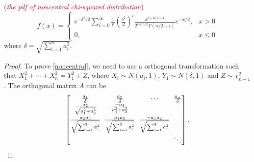 \documentclass{article}
\begin{document}
\begin{CJK}{UTF8}{gbsn}
    \begin{Inference}
        (\textcolor{red}{\textit{the pdf of noncentral chi-squared distribution}})
        \begin{equation}
            f(x) =
            \begin{cases}
                e^{-\delta^2/2}\mathop{\sum}\limits_{i=0}^{\infty} \frac{1}{i!}\left ( \frac{\delta^2}{2} \right )^i \frac{x^{i+n/2-1}}{2^{i+n/2}\Gamma(n/2+i)}e^{-x/2}, & x > 0    \\
                0,                                                                                                                                                       & x \leq 0
            \end{cases}
            \label{noncentral}
        \end{equation}
        where $\delta = \sqrt{\mathop{\sum}\limits_{i=1}^n a_i^2}$.

    \end{Inference}
    \begin{proof}
        To prove \eqref{noncentral}, we need to use a orthogonal transformation such that
        $X_1^2+\cdots+X_n^2 = Y_1^2+Z$, where $X_i\sim N(a_i, 1)$, $Y_1\sim N(\delta, 1)$ and
        $Z\sim \chi_{n-1}^2$. The orthogonal matrix $A$ can be
        \[
            \setlength{\arraycolsep}{3pt}
            \begin{bmatrix}
                \frac{a_1}{\delta}                      & \frac{a_2}{\delta}                      & \cdots                                   & \frac{a_n}{\delta} \\
                \frac{a_2}{\sqrt{a_1^2+a_2^2}}          & \frac{-a_1}{a_1^2 + a_2^2}              &                                          &                    \\[7pt]
                \frac{a_2a_3}{\sqrt{\sum_{i=1}^3a_i^2}} & \frac{a_1a_3}{\sqrt{\sum_{i=1}^3a_i^2}} & \frac{-a_1a_2}{\sqrt{\sum_{i=1}^3a_i^2}} &                    \\[7pt]
                                                        &                                         &                                          & \ddots             \\
            \end{bmatrix}.
        \]
    \end{proof}

\end{CJK}
\end{document}
